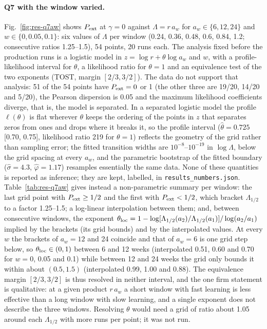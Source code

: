 \paragraph{Q7 with the window varied.}
Fig.~\ref{fig:res-q7aw} shows $P_{\rm ext}$ at $\gamma=0$ against $\Lambda=r\,a_w$ for $a_w\in\{6,12,24\}$ and
$w\in\{0,0.05,0.1\}$: six values of $\Lambda$ per window (0.24, 0.36, 0.48, 0.6, 0.84, 1.2; consecutive ratios
1.25--1.5), 54 points, 20 runs each. The analysis fixed before the production runs is a logistic model in $z=\log r+\theta\log a_w$ and $w$,
with a profile-likelihood interval for $\theta$, a likelihood ratio for $\theta=1$ and an equivalence test of the
two exponents (TOST, margin $[2/3,3/2]$). The data do not support that analysis: 51 of the 54 points have
$P_{\rm ext}=0$ or 1 (the other three are 19/20, 14/20 and 5/20), the Pearson dispersion is 0.05 and the maximum
likelihood coefficients diverge, that is, the model is separated. In a separated logistic model the profile
$\ell(\theta)$ is flat wherever $\theta$ keeps the ordering of the points in $z$ that separates zeros from ones and
drops where it breaks it, so the profile interval ($\hat\theta=0.725$ [0.70, 0.75], likelihood ratio 219 for
$\theta=1$) reflects the geometry of the grid rather than sampling error; the fitted
transition widths are $10^{-8}$--$10^{-19}$ in $\log\Lambda$, below the grid spacing at every $a_w$, and the parametric
bootstrap of the fitted boundary ($\hat\sigma=4.3$, $\hat\varphi=1.17$) resamples essentially the same data. None of
these quantities is reported as inference; they are kept, labelled, in \texttt{results\_numbers.json}.
Table~\ref{tab:res-q7aw} gives instead a non-parametric summary per window: the last grid point with
$P_{\rm ext}\ge1/2$ and the first with $P_{\rm ext}<1/2$, which bracket $\Lambda_{1/2}$ to a factor 1.25--1.5; a
log-linear interpolation between them; and, between consecutive windows, the exponent
$\theta_{\rm loc}=1-\log[\Lambda_{1/2}(a_2)/\Lambda_{1/2}(a_1)]/\log(a_2/a_1)$ implied by the brackets (its grid
bounds) and by the interpolated values. At every $w$ the brackets of $a_w=12$ and 24 coincide and that of $a_w=6$ is
one grid step below, so $\theta_{\rm loc}\in(0,1)$ between 6 and 12 weeks (interpolated 0.51, 0.60 and 0.70 for
$w=0$, 0.05 and 0.1) while between 12 and 24 weeks the grid only bounds it within about $(0.5,1.5)$ (interpolated
0.99, 1.00 and 0.88). The equivalence margin $[2/3,3/2]$ is thus resolved in neither interval, and the one firm
statement is qualitative: at a given product $r\,a_w$ a short window with fast learning is less effective than a
long window with slow learning, and a single exponent does not describe the three windows. Resolving $\theta$
would need a grid of ratio about 1.05 around each $\Lambda_{1/2}$ with more runs per point; it was not run.

